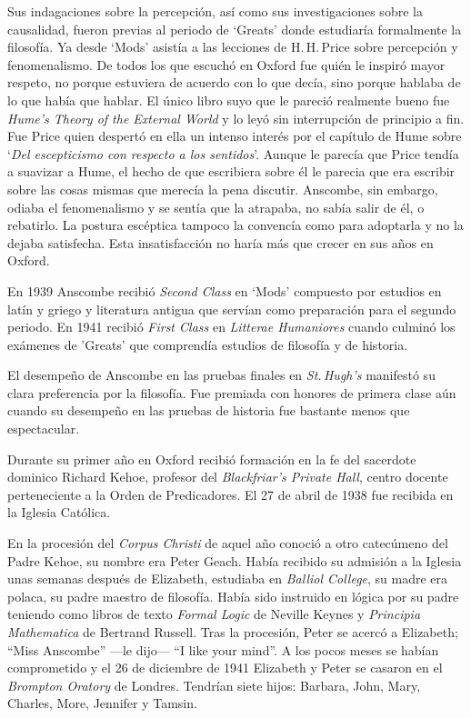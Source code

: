 Sus indagaciones sobre la percepción, así como sus investigaciones sobre la causalidad, fueron previas al periodo de `Greats' donde estudiaría formalmente la filosofía. Ya desde `Mods' asistía a las lecciones de H.\,H.\,Price sobre percepción y fenomenalismo. De todos los que escuchó en Oxford fue quién le inspiró mayor respeto, no porque estuviera de acuerdo con lo que decía, sino porque hablaba de lo que había que hablar. El único libro suyo que le pareció realmente bueno fue \emph{Hume's Theory of the External World} y lo leyó sin interrupción de principio a fin. Fue Price quien despertó en ella un intenso interés por el capítulo de Hume sobre \enquote*{\emph{Del escepticismo con respecto a los sentidos}}. Aunque le parecía que Price tendía a suavizar a Hume, el hecho de que escribiera sobre él le parecia que era escribir sobre las cosas mismas que merecía la pena discutir. Anscombe, sin embargo, odiaba el fenomenalismo y se sentía que la atrapaba, no sabía salir de él, o rebatirlo. La postura escéptica tampoco la convencía como para adoptarla y no la dejaba satisfecha. Esta insatisfacción no haría más que crecer en sus años en Oxford. \autocites[Cf.~][viii]{anscombe1981metaphysics} [~y~][26]{torralba2005accion}

En 1939 Anscombe recibió \emph{Second Class} en `Mods' compuesto por estudios en latín y griego y literatura antigua que servían como preparación para el segundo periodo. En 1941 recibió \emph{First Class} en \emph{Litterae Humaniores} cuando culminó los exámenes de 'Greats' que comprendía estudios de filosofía y de historia.

El desempeño de Anscombe en las pruebas finales en \emph{St.\,Hugh's} manifestó su clara preferencia por la filosofía. Fue premiada con honores de primera clase aún cuando su desempeño en las pruebas de historia fue bastante menos que espectacular.\autocite[Cf.~][3]{teichmann2008ans}

Durante su primer año en Oxford recibió formación en la fe del sacerdote dominico Richard Kehoe, profesor del \emph{Blackfriar's Private Hall}, centro docente perteneciente a la Orden de Predicadores. El 27 de abril de 1938 fue recibida en la Iglesia Católica.

En la procesión del \emph{Corpus Christi} de aquel año conoció a otro catecúmeno del Padre Kehoe, su nombre era Peter Geach. Había recibido su admisión a la Iglesia unas semanas después de Elizabeth, estudiaba en \emph{Balliol College}, su madre era polaca, su padre maestro de filosofía. Había sido instruido en lógica por su padre teniendo como libros de texto \emph{Formal Logic} de Neville Keynes y \emph{Principia Mathematica} de Bertrand Russell. Tras la procesión, Peter se acercó a Elizabeth; \enquote{Miss Anscombe} ---le dijo--- \enquote{I like your mind}.\autocite[Cf.~][187]{kenny2016fellows} A los pocos meses se habían comprometido y el 26 de diciembre de 1941 Elizabeth y Peter se casaron en el \emph{Brompton Oratory} de Londres.\autocite[Cf.~][33]{teichman2002fellows} Tendrían siete hijos: Barbara, John, Mary, Charles, More, Jennifer y Tamsin.

